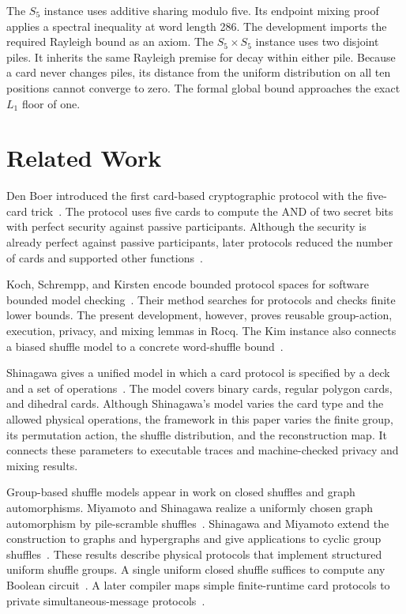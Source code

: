\documentclass[runningheads]{llncs}
\newcommand{\Rocq}{Rocq}
\begin{document}
The $S_5$ instance uses additive sharing modulo five. Its endpoint mixing
proof applies a spectral inequality at word length 286. The development
imports the required Rayleigh bound as an axiom. The $S_5\times S_5$ instance
uses two disjoint piles. It inherits the same Rayleigh premise for decay
within either pile. Because a card never changes piles, its distance from the uniform
distribution on all ten positions cannot converge to zero. The formal global
bound approaches the exact $L_1$ floor of one.

\section{Related Work}\label{sec:related}

Den Boer introduced the first card-based cryptographic protocol with the
five-card trick~\cite{denBoer1989,KochFUN2021}. The protocol uses five cards
to compute the AND of two secret bits with perfect security against passive
participants. Although the security is already perfect against passive participants,
later protocols reduced the number of cards and supported other
functions~\cite{MizukiSone2009,MizukiSone2012,KochWalzerHartel2015}.

Koch, Schrempp, and Kirsten encode bounded protocol spaces for software
bounded model checking~\cite{Koch2019}. Their method searches for protocols
and checks finite lower bounds. The present development, however, proves reusable group-action,
execution, privacy, and mixing lemmas in \Rocq{}. The Kim
instance also connects a biased shuffle model to a concrete word-shuffle
bound~\cite{KimCetinkaya2025}.

Shinagawa gives a unified model in which a card protocol is specified by a
deck and a set of operations~\cite{Shinagawa2021}. The model covers binary
cards, regular polygon cards, and dihedral cards. Although Shinagawa's model varies the card type and the allowed physical
operations, the framework in this paper varies the finite group, its
permutation action, the shuffle distribution, and the reconstruction
map. It connects these parameters to executable
traces and machine-checked privacy and mixing results.

Group-based shuffle models appear in work on closed shuffles and graph
automorphisms. Miyamoto and Shinagawa realize a uniformly chosen graph
automorphism by pile-scramble shuffles~\cite{MiyamotoShinagawa2022}.
Shinagawa and Miyamoto extend the construction to graphs and hypergraphs and
give applications to cyclic group shuffles~\cite{ShinagawaMiyamoto2023}.
These results describe physical protocols that implement structured uniform
shuffle groups. A single uniform closed shuffle suffices to
compute any Boolean circuit~\cite{ShinagawaNuida2021}. A later compiler maps
simple finite-runtime card protocols to private simultaneous-message
protocols~\cite{ShinagawaNuida2025}.
\end{document}
